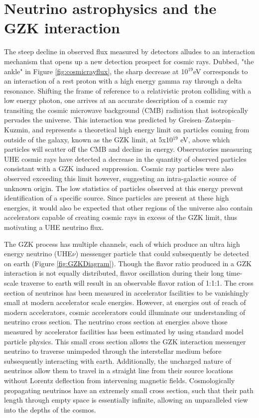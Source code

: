 \section{Neutrino astrophysics and the GZK interaction}
		The steep decline in observed flux measured by detectors alludes to an interaction mechanism that opens up a new detection prospect for cosmic rays.  Dubbed, "the ankle" in Figure \ref{fig:cosmicrayflux}, the sharp decrease at 10$^{19}$eV corresponds to an interaction of a rest proton with a high energy gamma ray through a delta resonance.  Shifting the frame of reference to a relativistic proton colliding with a low energy photon, one arrives at an accurate description of a cosmic ray transiting the cosmic microwave background (CMB) radiation that isotropically pervades the universe.\cite{WMAPCMBResults}  This interaction was predicted by Greisen–Zatsepin–Kuzmin, and represents a theoretical high energy limit on particles coming from outside of the galaxy, known as the GZK limit, at 5x10$^{19}$ eV, above which particles will scatter off the CMB and decline in energy.\cite{GZK}  Observatories measuring UHE cosmic rays have detected a decrease in the quantity of observed particles consistant with a GZK induced suppression.\cite{GZKMeasurement} Cosmic ray particles were also observed exceeding this limit however, suggesting an intra-galactic source of unknown origin.  The low statistics of particles observed at this energy prevent identification of a specific source.  Since particles are present at these high energies, it would also be expected that other regions of the universe also contain accelerators capable of creating cosmic rays in excess of the GZK limit, thus motivating a UHE neutrino flux.
		
		The GZK process has multiple channels, each of which produce an ultra high energy neutrino (UHE$\nu$) messenger particle that could subsequently be detected on earth (Figure \ref{fig:GZKDiagram})\cite{GZK}.  Though the flavor ratio produced in a GZK interaction is not equally distributed, flavor oscillation during their long time-scale traverse to earth will result in an observable flavor ration of 1:1:1.  The cross section of neutrinos has been measured in accelerator facilities to be vanishingly small at modern accelerator scale energies.\cite{neutrinoCrossSectionMeasurements}  However, at energies out of reach of modern accelerators, cosmic accelerators could illuminate our understanding of neutrino cross section.  The neutrino cross section at energies above those measured by accelerator facilities has been estimated by using standard model particle physics.\cite{neutrinoCrossSectionExtrapolation} This small cross section allows the GZK interaction messenger neutrino to traverse unimpeded through the interstellar medium before subsequently interacting with earth.  Additionally, the uncharged nature of neutrinos allow them to travel in a straight line from their source locations without Lorentz deflection from intervening magnetic fields.  Cosmologically propagating neutrinos have an extremely small cross section, such that their path length through empty space is essentially infinite, allowing an unparalleled view into the depths of the cosmos.


